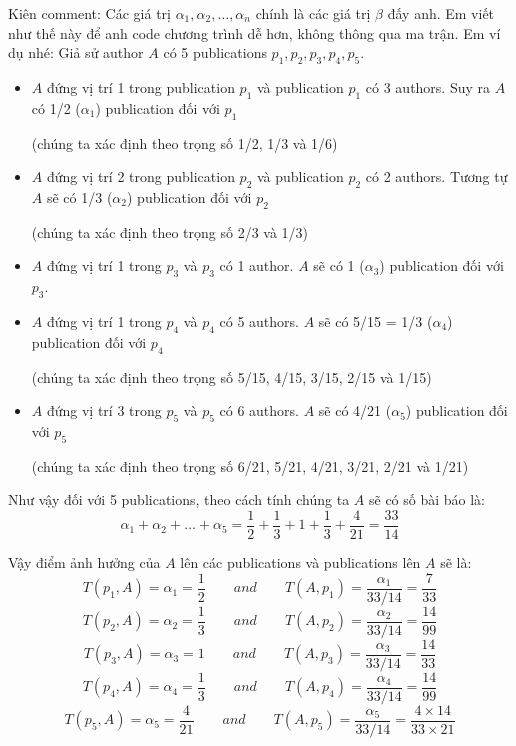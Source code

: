 \documentclass[lnicst]{svmultln}
\begin{document}
Kiên comment:
Các giá trị $\alpha_1,\alpha_2,\ldots,\alpha_n$ chính là các giá trị $\beta$ đấy anh. Em viết như thế này để anh code chương trình dễ hơn, không thông qua ma trận. Em ví dụ nhé: Giả sử author $A$ có 5 publications $p_1, p_2, p_3, p_4, p_5$.
\begin{itemize}
\item $A$ đứng vị trí 1 trong publication $p_1$ và publication $p_1$ có 3 authors. Suy ra $A$ có 1/2 ($\alpha_1$) publication đối với $p_1$ 
\begin{center}
(chúng ta xác định theo trọng số 1/2, 1/3 và 1/6)
\end{center}
\item $A$ đứng vị trí 2 trong publication $p_2$ và publication $p_2$ có 2 authors. Tương tự $A$ sẽ có 1/3 ($\alpha_2$) publication đối với $p_2$ 
\begin{center}
(chúng ta xác định theo trọng số 2/3 và 1/3)
\end{center}
\item $A$ đứng vị trí 1 trong $p_3$ và $p_3$ có 1 author. $A$ sẽ có 1 ($\alpha_3$) publication đối với $p_3$.
\item $A$ đứng vị trí 1 trong $p_4$ và $p_4$ có 5 authors. $A$ sẽ có 5/15 = 1/3 ($\alpha_4$) publication đối với $p_4$ 
\begin{center}
(chúng ta xác định theo trọng số 5/15, 4/15, 3/15, 2/15 và 1/15)
\end{center}
\item $A$ đứng vị trí 3 trong $p_5$ và $p_5$ có 6 authors. $A$ sẽ có 4/21 ($\alpha_5$) publication đối với $p_5$ 
\begin{center}
(chúng ta xác định theo trọng số 6/21, 5/21, 4/21, 3/21, 2/21 và 1/21)
\end{center}
\end{itemize}

Như vậy đối với 5 publications, theo cách tính chúng ta $A$ sẽ có số bài báo là:
\[\alpha_1 + \alpha_2 + \ldots + \alpha_5 = \frac{1}{2} + \frac{1}{3} + 1 + \frac{1}{3} + \frac{4}{21} = \frac{33}{14}\]

Vậy điểm ảnh hưởng của $A$ lên các publications và publications lên $A$ sẽ là:
\[T(p_1,A) = \alpha_1 = \frac{1}{2} \qquad and \qquad T(A,p_1) = \frac{\alpha_1}{33/14} = \frac{7}{33}\]
\[T(p_2,A) = \alpha_2 = \frac{1}{3} \qquad and \qquad T(A,p_2) = \frac{\alpha_2}{33/14} = \frac{14}{99}\]
\[T(p_3,A) = \alpha_3 = 1 \qquad and \qquad T(A,p_3) = \frac{\alpha_3}{33/14} = \frac{14}{33}\]
\[T(p_4,A) = \alpha_4 = \frac{1}{3} \qquad and \qquad T(A,p_4) = \frac{\alpha_4}{33/14} = \frac{14}{99}\]
\[T(p_5,A) = \alpha_5 = \frac{4}{21} \qquad and \qquad T(A,p_5) = \frac{\alpha_5}{33/14} = \frac{4\times14}{33\times21}\]
\end{document}
